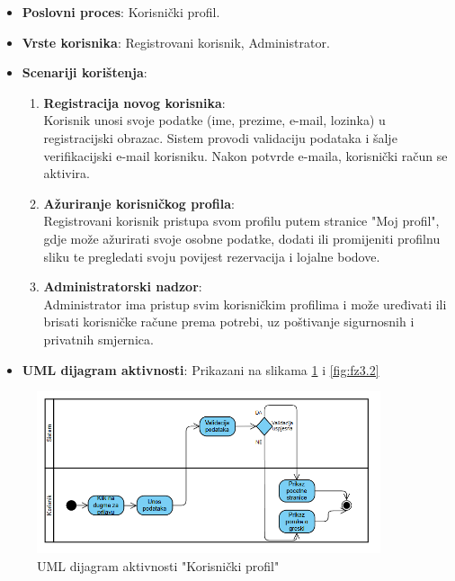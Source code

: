 \begin{itemize}
    \item \textbf{Poslovni proces}: Korisnički profil.
    \item \textbf{Vrste korisnika}: Registrovani korisnik, Administrator.
    \item \textbf{Scenariji korištenja}:
    \begin{enumerate}
        \item \textbf{Registracija novog korisnika}: \\
        Korisnik unosi svoje podatke (ime, prezime, e-mail, lozinka) u registracijski obrazac. Sistem provodi validaciju podataka i šalje verifikacijski e-mail korisniku. Nakon potvrde e-maila, korisnički račun se aktivira.
        
        \item \textbf{Ažuriranje korisničkog profila}: \\
        Registrovani korisnik pristupa svom profilu putem stranice "Moj profil", gdje može ažurirati svoje osobne podatke, dodati ili promijeniti profilnu sliku te pregledati svoju povijest rezervacija i lojalne bodove.
        
        \item \textbf{Administratorski nadzor}: \\
        Administrator ima pristup svim korisničkim profilima i može uređivati ili brisati korisničke račune prema potrebi, uz poštivanje sigurnosnih i privatnih smjernica.
    \end{enumerate}
    \item \textbf{UML dijagram aktivnosti}: Prikazani na slikama \ref{fig:fz3.1} i \ref{fig:fz3.2}
\end{itemize}

\begin{figure}[H]
    \centering
    \includegraphics[width=0.9\textwidth]{Slike/fz3.1.png}
    \caption{UML dijagram aktivnosti "Korisnički profil"}
    \label{fig:fz3.1}
\end{figure}

